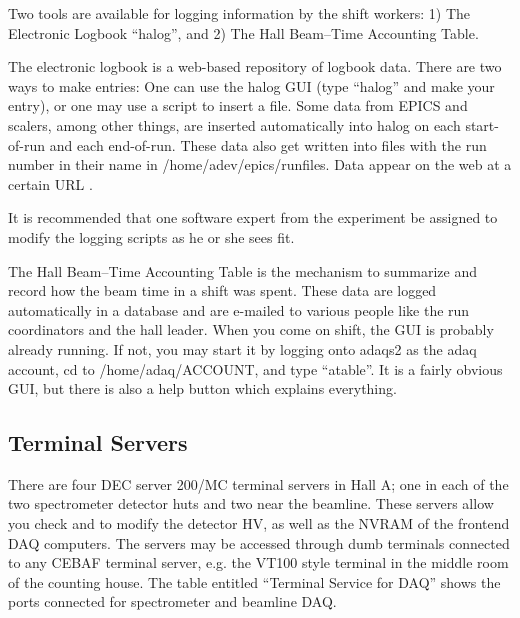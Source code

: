 Two tools are available for logging information
by the shift workers: \hskip 0.05in
1) The Electronic Logbook ``halog'', and
\hskip 0.05in
2) The Hall Beam--Time Accounting Table.

\par
The electronic logbook is a web-based
repository of logbook data.  There are
two ways to make entries:  One can use
the halog GUI (type ``halog'' and make your 
entry), or one may use a script
to insert a file.  
Some data from EPICS
and scalers, among other things, are inserted
automatically into halog on each start-of-run
and each end-of-run.  These data also get
written into files with the run number in
their name in /home/adev/epics/runfiles.
Data appear on the web at a certain URL%
.

It is recommended that one software expert
from the experiment be
assigned to modify the logging scripts
as he or she sees fit.

\par 
The Hall Beam--Time Accounting Table is the mechanism
to summarize and record
how the beam time in a shift was spent.  
These data are logged automatically in a database
and are e-mailed to various people like the
run coordinators and the hall leader.
When you come on shift, the GUI is probably
already running.  If not, you may start it
by logging onto adaqs2 as the
adaq account, cd to /home/adaq/ACCOUNT, and
type ``atable''.  It is a fairly obvious GUI,
but there is also a help button
which explains everything.


\subsection {Terminal Servers}
There are four DEC 
server 200/MC terminal servers in Hall A;
one in each of the two spectrometer detector
huts and two near the beamline.
These servers allow you check and to modify the
detector HV, as well as the NVRAM of the 
frontend DAQ computers. 
The servers may be accessed through
dumb terminals connected to any CEBAF terminal server,
e.g. the VT100 style terminal in the
middle room of the counting house.
The table entitled ``Terminal Service for DAQ'' 
shows the ports
connected for spectrometer and beamline DAQ.

